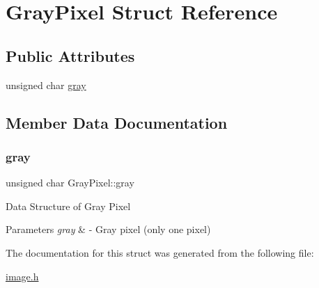 \hypertarget{struct_gray_pixel}{}\section{Gray\+Pixel Struct Reference}
\label{struct_gray_pixel}
\subsection*{Public Attributes}
\begin{DoxyCompactItemize}
\item 
unsigned char \hyperlink{struct_gray_pixel_a130fe85eba0d22bbb5964f07dcdc5f53}{gray}
\end{DoxyCompactItemize}


\subsection{Member Data Documentation}
\mbox{\label{struct_gray_pixel_a130fe85eba0d22bbb5964f07dcdc5f53}} 
\subsubsection{\texorpdfstring{gray}{gray}}
{\footnotesize\ttfamily unsigned char Gray\+Pixel\+::gray}

Data Structure of Gray Pixel 
\begin{DoxyParams}{Parameters}
{\em gray} & -\/ Gray pixel (only one pixel) \\
\hline
\end{DoxyParams}


The documentation for this struct was generated from the following file\+:\begin{DoxyCompactItemize}
\item 
\hyperlink{image_8h}{image.\+h}\end{DoxyCompactItemize}

